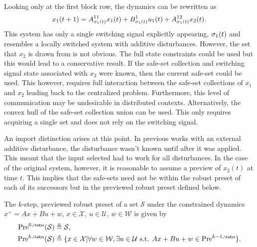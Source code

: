\documentclass[10pt,a4paper]{article}
\begin{document}
Looking only at the first block row, the dynamics can be rewritten as 
\begin{equation}
x_1(t+1)=A^{11}_{\ss_1(t)}x_1(t)+B^1_{\ss_1(t)}u_1(t)+A^{12}_{\ss_1(t)}x_2(t).
\end{equation}
This system has only a single switching signal explicitly appearing, $\ss_1(t)$ and resembles a locally switched system with additive disturbances. However, the set that $x_2$ is drawn from is not obvious. The full state constraints could be used but this would lead to a conservative result. If the safe-set collection and switching signal state associated with $x_2$ were known, then the current safe-set could be used. This however, requires full interaction between the safe-set collections of $x_1$ and $x_2$ leading back to the centralized problem. Furthermore, this level of communication may be undesirable in distributed contexts. Alternatively, the convex hull of the safe-set collection union can be used. This only requires acquiring a single set and does not rely on the switching signal. 

An import distinction arises at this point. In previous works with an external additive disturbance, the disturbance wasn't known until after it was applied. This meant that the input selected had to work for all disturbances. In the case of the original system, however, it is reasonable to assume a preview of $x_2(t)$ at time $t$. This implies that the safe-sets need not be within the robust preset of each of its successors but in the previewed robust preset defined below.
\begin{definition}
The $k$-step, previewed robust preset of a set $\mathcal{S}$ under the constrained dynamics $x^+=Ax+Bu+w$, $x\in\mathcal{X}$, $u\in\mathcal{U}$, $w\in\mathcal{W}$ is given by
\begin{align}
\text{Pre}^{0,\text{\tiny\faEye}}(\mathcal{S})&\triangleq\mathcal{S},\\
\text{Pre}^{k,\text{\tiny\faEye}}(\mathcal{S})&\triangleq\{x\in\mathcal{X}|\forall w\in\mathcal{W},\exists u\in\mathcal{U}\text{ s.t. }Ax+Bu+w\in\text{Pre}^{k-1,\text{\tiny\faEye}}\}.
\end{align}
\end{definition}
\printbibliography
\end{document}

